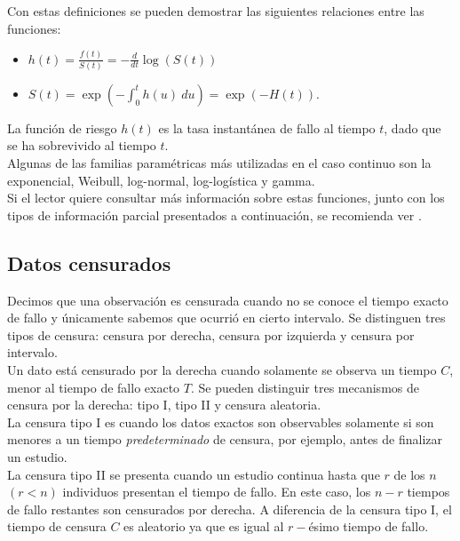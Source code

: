 \documentclass[11pt,a4paper]{article}
\begin{document}
Con estas definiciones se pueden demostrar las siguientes relaciones entre las funciones:
\begin{itemize}
\item $h(t) = \frac{f(t)}{S(t)} = -\frac{d}{dt}\log(S(t))$
\item $S(t) = \exp \left(-\int_0^t h(u) \ du\right) = \exp(-H(t)).$\\
\end{itemize}

La función de riesgo $h(t)$ es la tasa instantánea de fallo al tiempo $t$, dado que se ha sobrevivido al tiempo $t$.\\

Algunas de las familias paramétricas más utilizadas en el caso continuo son la exponencial, Weibull, log-normal, log-logística y gamma.\\

Si el lector quiere consultar más información sobre estas funciones, junto con los tipos de información parcial presentados a continuación, se recomienda ver \citet{klein}.

\subsection{Datos censurados}

Decimos que una observación es censurada cuando no se conoce el tiempo exacto de fallo y únicamente sabemos que ocurrió en cierto intervalo. Se distinguen tres tipos de censura: censura por derecha, censura por izquierda y censura por intervalo.\\

Un dato está censurado por la derecha cuando solamente se observa un tiempo $C$, menor al tiempo de fallo exacto $T$. Se pueden distinguir tres mecanismos de censura por la derecha: tipo I, tipo II y censura aleatoria.\\

La censura tipo I es cuando los datos exactos son observables solamente si son menores a un tiempo \textit{predeterminado} de censura, por ejemplo, antes de finalizar un estudio.\\

La censura tipo II se presenta cuando un estudio continua hasta que $r$ de los $n$ $(r<n)$ individuos presentan el tiempo de fallo. En este caso, los $n-r$ tiempos de fallo restantes son censurados por derecha. A diferencia de la censura tipo I, el tiempo de censura $C$ es aleatorio ya que es igual al $r-$ésimo tiempo de fallo.\\
\end{document}
